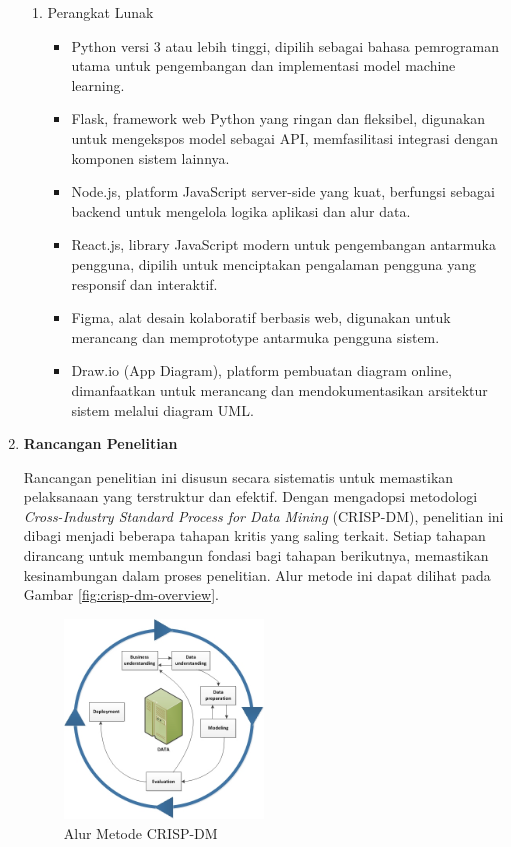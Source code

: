 \begin{enumerate}
\begin{enumerate}
        \item Perangkat Lunak
        \begin{itemize}
            \item Python versi 3 atau lebih tinggi, dipilih sebagai bahasa pemrograman utama untuk pengembangan dan implementasi model machine learning.
            \item Flask, framework web Python yang ringan dan fleksibel, digunakan untuk mengekspos model sebagai API, memfasilitasi integrasi dengan komponen sistem lainnya.
            \item Node.js, platform JavaScript server-side yang kuat, berfungsi sebagai backend untuk mengelola logika aplikasi dan alur data.
            \item React.js, library JavaScript modern untuk pengembangan antarmuka pengguna, dipilih untuk menciptakan pengalaman pengguna yang responsif dan interaktif.
            \item Figma, alat desain kolaboratif berbasis web, digunakan untuk merancang dan memprototype antarmuka pengguna sistem.
            \item Draw.io (App Diagram), platform pembuatan diagram online, dimanfaatkan untuk merancang dan mendokumentasikan arsitektur sistem melalui diagram UML.
        \end{itemize}
    \end{enumerate}

    \item \textbf{Rancangan Penelitian}
    
    Rancangan penelitian ini disusun secara sistematis untuk memastikan pelaksanaan yang terstruktur dan efektif. Dengan mengadopsi metodologi \textit{Cross-Industry Standard Process for Data Mining} (CRISP-DM), penelitian ini dibagi menjadi beberapa tahapan kritis yang saling terkait. Setiap tahapan dirancang untuk membangun fondasi bagi tahapan berikutnya, memastikan kesinambungan dalam proses penelitian. Alur metode ini dapat dilihat pada Gambar \ref{fig:crisp-dm-overview}.

    \begin{figure}[htbp]
        \centering
        \includegraphics[width=0.5\textwidth]{images/crisp-dm-overview.jpg}
        \caption{Alur Metode CRISP-DM \cite{IBM2022}}
        \label{fig:crisp-dm-alur}
    \end{figure}


\end{enumerate}
